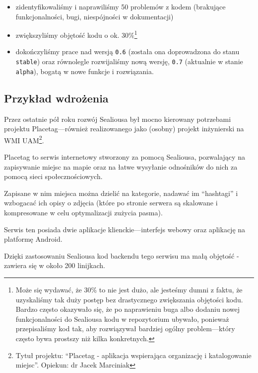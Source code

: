 \documentclass[12pt,polish,a4paper,]{report}
\providecommand{\tightlist}{%
  \setlength{\itemsep}{0pt}\setlength{\parskip}{0pt}}
\begin{document}
\begin{itemize}
\tightlist
\item
  zidentyfikowaliśmy i naprawiliśmy 50 problemów z kodem (brakujące
  funkcjonalności, bugi, niespójności w dokumentacji)
\item
  zwiększyliśmy objętość kodu o ok. 30\%\footnote{Może się wydawać, że
    30\% to nie jest dużo, ale jesteśmy dumni z faktu, że uzyskaliśmy
    tak duży postęp bez drastycznego zwiększania objętości kodu. Bardzo
    często okazywało się, że po naprawieniu buga albo dodaniu nowej
    funkcjonalności do Sealiousa kodu w repozytorium ubywało, ponieważ
    przepisaliśmy kod tak, aby rozwiązywał bardziej ogólny
    problem---który często bywa prostszy niż kilka konkretnych.}
\item
  dokończyliśmy prace nad wersją \texttt{0.6} (została ona doprowadzona
  do stanu \texttt{stable}) oraz równolegle rozwijaliśmy nową wersję,
  \texttt{0.7} (aktualnie w stanie \texttt{alpha}), bogatą w nowe
  funkcje i rozwiązania.
\end{itemize}

\subsection{Przykład wdrożenia}\label{przykux142ad-wdroux17cenia}

Przez ostatnie pół roku rozwój Sealiousa był mocno kierowany potrzebami
projektu Placetag---również realizowanego jako (osobny) projekt
inżynierski na WMI UAM\footnote{Tytuł projektu: ``Placetag - aplikacja
  wspierająca organizację i katalogowanie miejsc''. Opiekun: dr Jacek
  Marciniak}.

Placetag to serwis internetowy stworzony za pomocą Sealiousa,
pozwalający na zapisywanie miejsc na mapie oraz na łatwe wysyłanie
odnośników do nich za pomocą sieci społecznościowych.

Zapisane w nim miejsca można dzielić na kategorie, nadawać im
``hashtagi'' i wzbogacać ich opisy o zdjęcia (które po stronie serwera
są skalowane i kompresowane w celu optymalizacji zużycia pasma).

Serwis ten posiada dwie aplikacje klienckie---interfejs webowy oraz
aplikację na platformę Android.

Dzięki zastosowaniu Sealiousa kod backendu tego serwisu ma małą objętość
- zawiera się w około 200 linijkach.
\end{document}
